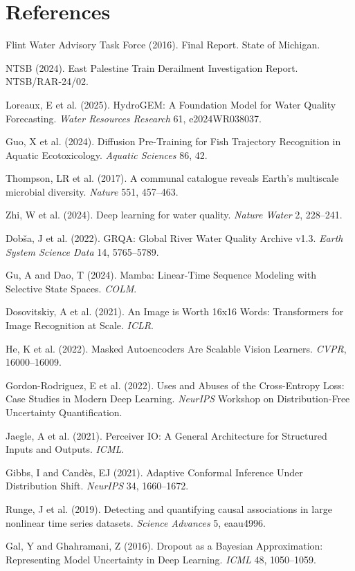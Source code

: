 \documentclass[12pt]{article}
\begin{document}
\section{References}
\small
\begin{enumerate}[label={[\arabic*]}, nosep]
\item Flint Water Advisory Task Force (2016). Final Report. State of Michigan.
\item NTSB (2024). East Palestine Train Derailment Investigation Report. NTSB/RAR-24/02.
\item Loreaux, E et al. (2025). HydroGEM: A Foundation Model for Water Quality Forecasting. \textit{Water Resources Research} 61, e2024WR038037.
\item Guo, X et al. (2024). Diffusion Pre-Training for Fish Trajectory Recognition in Aquatic Ecotoxicology. \textit{Aquatic Sciences} 86, 42.
\item Thompson, LR et al. (2017). A communal catalogue reveals Earth's multiscale microbial diversity. \textit{Nature} 551, 457--463.
\item Zhi, W et al. (2024). Deep learning for water quality. \textit{Nature Water} 2, 228--241.
\item Dob\v{s}a, J et al. (2022). GRQA: Global River Water Quality Archive v1.3. \textit{Earth System Science Data} 14, 5765--5789.
\item Gu, A and Dao, T (2024). Mamba: Linear-Time Sequence Modeling with Selective State Spaces. \textit{COLM}.
\item Dosovitskiy, A et al. (2021). An Image is Worth 16x16 Words: Transformers for Image Recognition at Scale. \textit{ICLR}.
\item He, K et al. (2022). Masked Autoencoders Are Scalable Vision Learners. \textit{CVPR}, 16000--16009.
\item Gordon-Rodriguez, E et al. (2022). Uses and Abuses of the Cross-Entropy Loss: Case Studies in Modern Deep Learning. \textit{NeurIPS} Workshop on Distribution-Free Uncertainty Quantification.
\item Jaegle, A et al. (2021). Perceiver IO: A General Architecture for Structured Inputs and Outputs. \textit{ICML}.
\item Gibbs, I and Cand{\`e}s, EJ (2021). Adaptive Conformal Inference Under Distribution Shift. \textit{NeurIPS} 34, 1660--1672.
\item Runge, J et al. (2019). Detecting and quantifying causal associations in large nonlinear time series datasets. \textit{Science Advances} 5, eaau4996.
\item Gal, Y and Ghahramani, Z (2016). Dropout as a Bayesian Approximation: Representing Model Uncertainty in Deep Learning. \textit{ICML} 48, 1050--1059.

\end{enumerate}
\end{document}
